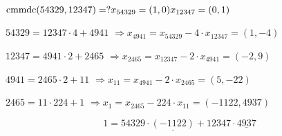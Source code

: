 \documentclass[a4paper, 14pt]{scrartcl}
\DeclareMathOperator{\cmmdc}{cmmdc}
\begin{document}
\noindent 
\( 
\cmmdc(54329, 12347) = ? \\ 
x_{54329} = (1, 0) 
 \\ 
x_{12347} = (0, 1) 
\) 
 \\ 
\begin{paracol}{2}
\( 
54329 = 12347 \cdot 4 + 4941
\) 
\switchcolumn
\( 
\Rightarrow x_{4941} = x_{54329} -4 \cdot x_{12347} = (1, -4)
\) 
\end{paracol} 
\begin{paracol}{2}
\( 
12347 = 4941 \cdot 2 + 2465
\) 
\switchcolumn
\( 
\Rightarrow x_{2465} = x_{12347} -2 \cdot x_{4941} = (-2, 9)
\) 
\end{paracol} 
\begin{paracol}{2}
\( 
4941 = 2465 \cdot 2 + 11
\) 
\switchcolumn
\( 
\Rightarrow x_{11} = x_{4941} -2 \cdot x_{2465} = (5, -22)
\) 
\end{paracol} 
\begin{paracol}{2}
\( 
2465 = 11 \cdot 224 + 1
\) 
\switchcolumn
\( 
\Rightarrow x_{1} = x_{2465} -224 \cdot x_{11} = (-1122, 4937)
\) 
\end{paracol} 
\[ 
1 = 54329 \cdot \underline{(-1122)} + 12347 \cdot \underline{4937} 
\] 
\end{document}
